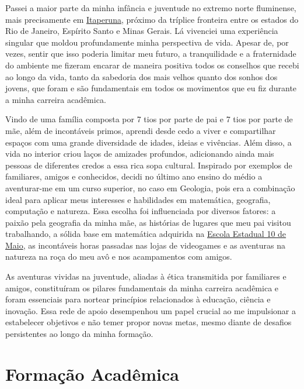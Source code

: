 \documentclass[10pt,a4paper,oneside]{book}
\begin{document}
Passei a maior parte da minha infância e juventude no extremo norte fluminense, mais precisamente em \href{https://www.itaperuna.rj.gov.br/pmi/}{Itaperuna}, próximo da tríplice fronteira entre os estados do Rio de Janeiro, Espírito Santo e Minas Gerais. Lá vivenciei uma experiência singular que moldou profundamente minha perspectiva de vida. Apesar de, por vezes, sentir que isso poderia limitar meu futuro, a tranquilidade e a fraternidade do ambiente me fizeram encarar de maneira positiva todos os conselhos que recebi ao longo da vida, tanto da sabedoria dos mais velhos quanto dos sonhos dos jovens, que foram e são fundamentais em todos os movimentos que eu fiz durante a minha carreira acadêmica.

Vindo de uma família composta por 7 tios por parte de pai e 7 tios por parte de mãe, além de incontáveis primos, aprendi desde cedo a viver e compartilhar espaços com uma grande diversidade de idades, ideias e vivências. Além disso, a vida no interior criou laços de amizades profundos, adicionando ainda mais pessoas de diferentes credos a essa rica sopa cultural. Inspirado por exemplos de familiares, amigos e conhecidos, decidi no último ano ensino do médio a aventurar-me em um curso superior, no caso em Geologia, pois era a combinação ideal para aplicar meus interesses e habilidades em matemática, geografia, computação e natureza. Essa escolha foi influenciada por diversos fatores: a paixão pela geografia da minha mãe, as histórias de lugares que meu pai visitou trabalhando, a sólida base em matemática adquirida na \href{https://qedu.org.br/escola/33001286-ce-dez-de-maio}{Escola Estadual 10 de Maio}, as incontáveis horas passadas nas lojas de videogames e as aventuras na natureza na roça do meu avô e nos acampamentos com amigos.

As aventuras vividas na juventude, aliadas à ética transmitida por familiares e amigos, constituíram os pilares fundamentais da minha carreira acadêmica e foram essenciais para nortear princípios relacionados à educação, ciência e inovação. Essa rede de apoio desempenhou um papel crucial ao me impulsionar a estabelecer objetivos e não temer propor novas metas, mesmo diante de desafios persistentes ao longo da minha formação.

\chapter{Formação Acadêmica}
\label{cap_formacao}
\end{document}
